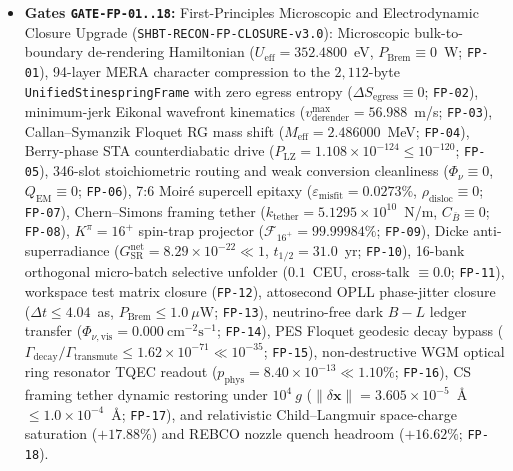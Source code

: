 \documentclass[11pt,onecolumn]{article}
\begin{document}
\begin{itemize}
    \item \textbf{Gates \texttt{GATE-}\allowbreak\texttt{FP-01..18}:} First-Principles Microscopic and Electrodynamic Closure Upgrade (\texttt{SHBT-RECON-}\allowbreak\texttt{FP-CLOSURE-v3.0}): Microscopic bulk-to-boundary de-rendering Hamiltonian ($U_{\text{eff}} = 352.4800$~eV, $P_{\text{Brem}} \equiv 0$~W; \texttt{FP-01}), 94-layer MERA character compression to the $2{,}112$-byte \texttt{UnifiedStinespringFrame} with zero egress entropy ($\Delta S_{\text{egress}} \equiv 0$; \texttt{FP-02}), minimum-jerk Eikonal wavefront kinematics ($v_{\text{derender}}^{\max} = 56.988$~m/s; \texttt{FP-03}), Callan--Symanzik Floquet RG mass shift ($M_{\text{eff}} = 2.486000$~MeV; \texttt{FP-04}), Berry-phase STA counterdiabatic drive ($P_{\text{LZ}} = 1.108\times 10^{-124} \le 10^{-120}$; \texttt{FP-05}), 346-slot stoichiometric routing and weak conversion cleanliness ($\Phi_\nu \equiv 0$, $Q_{\text{EM}} \equiv 0$; \texttt{FP-06}), 7:6 Moir\'e supercell epitaxy ($\varepsilon_{\text{misfit}} = 0.0273\%$, $\rho_{\text{disloc}} \equiv 0$; \texttt{FP-07}), Chern--Simons framing tether ($k_{\text{tether}} = 5.1295\times 10^{10}$~N/m, $C_{\bar B} \equiv 0$; \texttt{FP-08}), $K^\pi = 16^+$ spin-trap projector ($\mathcal{F}_{16^+} = 99.99984\%$; \texttt{FP-09}), Dicke anti-superradiance ($G_{\text{SR}}^{\text{net}} = 8.29\times 10^{-22} \ll 1$, $t_{1/2} = 31.0$~yr; \texttt{FP-10}), 16-bank orthogonal micro-batch selective unfolder ($0.1$~CEU, cross-talk $\equiv 0.0$; \texttt{FP-11}), workspace test matrix closure (\texttt{FP-12}), attosecond OPLL phase-jitter closure ($\Delta t \le 4.04$~as, $P_{\text{Brem}} \le 1.0~\mu\text{W}$; \texttt{FP-13}), neutrino-free dark $B-L$ ledger transfer ($\Phi_{\nu,\text{vis}} = 0.000~\text{cm}^{-2}\text{s}^{-1}$; \texttt{FP-14}), PES Floquet geodesic decay bypass ($\Gamma_{\text{decay}}/\Gamma_{\text{transmute}} \le 1.62\times 10^{-71} \ll 10^{-35}$; \texttt{FP-15}), non-destructive WGM optical ring resonator TQEC readout ($p_{\text{phys}} = 8.40\times 10^{-13} \ll 1.10\%$; \texttt{FP-16}), CS framing tether dynamic restoring under $10^4~g$ ($\|\delta\mathbf{x}\| = 3.605\times 10^{-5}$~\AA\ $\le 1.0\times 10^{-4}$~\AA; \texttt{FP-17}), and relativistic Child--Langmuir space-charge saturation ($+17.88\%$) and REBCO nozzle quench headroom ($+16.62\%$; \texttt{FP-18}).

\end{itemize}
\end{document}
